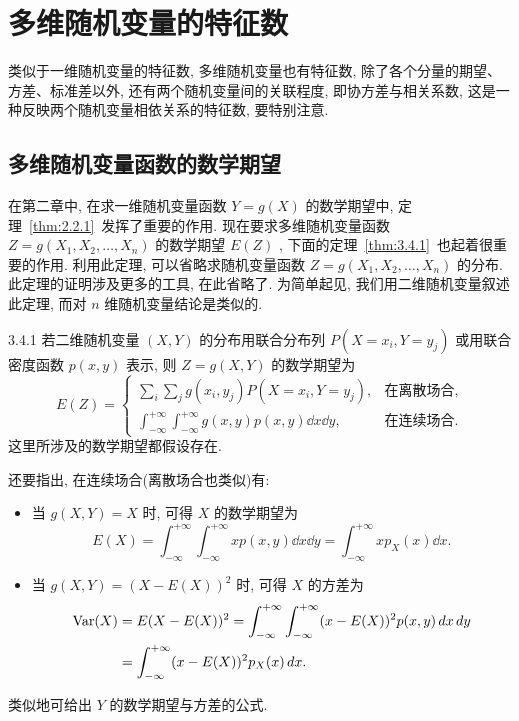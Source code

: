   \section{多维随机变量的特征数}\label{sec:3.4}
  类似于一维随机变量的特征数, 多维随机变量也有特征数, 除了各个分量的期望、方差、标准差以外, 还有两个随机变量间的关联程度, 即协方差与相关系数, 这是一种反映两个随机变量相依关系的特征数, 要特别注意.
  \subsection{多维随机变量函数的数学期望}\label{ssec:3.4.1}
  在第二章中, 在求一维随机变量函数 $Y=g(X)$ 的数学期望中, 定理~\ref{thm:2.2.1}~发挥了重要的作用. 现在要求多维随机变量函数 $Z=g(X_1,X_2,\ldots,X_n)$ 的数学期望 $E(Z)$ , 下面的定理~\ref{thm:3.4.1}~也起着很重要的作用. 利用此定理, 可以省略求随机变量函数 $Z=g(X_1,X_2,\ldots,X_n)$ 的分布. 此定理的证明涉及更多的工具, 在此省略了. 为简单起见, 我们用二维随机变量叙述此定理, 而对 $n$ 维随机变量结论是类似的.
  \begin{theorem}{}{3.4.1}
  	若二维随机变量 $(X,Y)$ 的分布用联合分布列 $P(X=x_i,Y=y_j)$ 或用联合密度函数 $p(x,y)$ 表示, 则 $Z=g(X,Y)$ 的数学期望为
  	\begin{equation}\label{eq:3.4.1}
  		E(Z)=\begin{cases}
  		\sum_{i}\sum_{j}g(x_i,y_j)P(X=x_i,Y=y_j), & \text{在离散场合},\\
  		\int_{-\infty}^{+\infty}\int_{-\infty}^{+\infty}g(x,y)p(x,y)\dd x\dd y, & \text{在连续场合}.
  		\end{cases}
  	\end{equation}
  	这里所涉及的数学期望都假设存在.
  	
  	还要指出, 在连续场合(离散场合也类似)有:
  	\begin{itemize}
  		\item 当 $g(X,Y)=X$ 时, 可得 $X$ 的数学期望为
  		\begin{equation*}
  			E(X)=\int_{-\infty}^{+\infty}\int_{-\infty}^{+\infty}xp(x,y)\dd x\dd y=\int_{-\infty}^{+\infty}xp_{X}(x)\dd x.
  		\end{equation*}
  		\item 当 $g(X,Y)=(X-E(X))^2$ 时, 可得 $X$ 的方差为
  		\begin{align*}
  			\operatorname{Var}(X)&=E(X-E(X))^2=\int_{-\infty}^{+\infty}\int_{-\infty}^{+\infty}(x-E(X))^2p(x,y)\,d x\,d y\\
  			&=\int_{-\infty}^{+\infty}(x-E(X))^2p_{X}(x)\,d x.
  		\end{align*}
  	\end{itemize}
  
    类似地可给出 $Y$ 的数学期望与方差的公式.
  \end{theorem}
